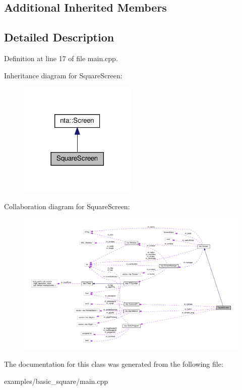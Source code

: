 \subsection*{Additional Inherited Members}


\subsection{Detailed Description}


Definition at line 17 of file main.\+cpp.



Inheritance diagram for Square\+Screen\+:\nopagebreak
\begin{figure}[H]
\begin{center}
\leavevmode
\includegraphics[width=158pt]{da/d66/classSquareScreen__inherit__graph}
\end{center}
\end{figure}


Collaboration diagram for Square\+Screen\+:
\nopagebreak
\begin{figure}[H]
\begin{center}
\leavevmode
\includegraphics[width=350pt]{d0/d42/classSquareScreen__coll__graph}
\end{center}
\end{figure}


The documentation for this class was generated from the following file\+:\begin{DoxyCompactItemize}
\item 
examples/basic\+\_\+square/main.\+cpp\end{DoxyCompactItemize}
